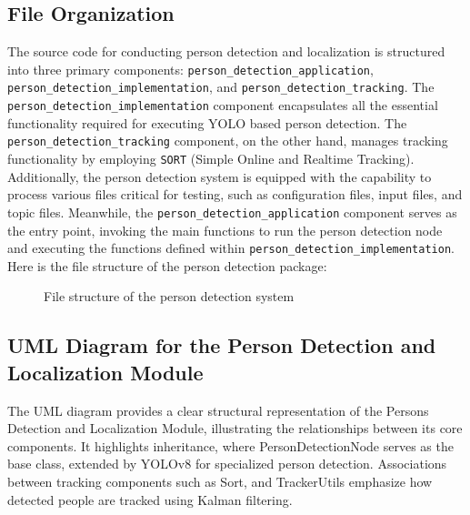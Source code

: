 \documentclass{CSSRforAfrica}
\begin{document}
\subsection*{File Organization}
The source code for conducting person detection and localization is structured into three primary components: \texttt{person\_detection\_application}, \texttt{person\_detection\_implementation}, and \texttt{person\_detection\_tracking}. The \texttt{person\_detection\_implementation} component encapsulates all the essential functionality required for executing YOLO based person detection. The \texttt{person\_detection\_tracking} component, on the other hand, manages tracking functionality by employing \texttt{SORT} (Simple Online and Realtime Tracking). Additionally, the person detection system is equipped with the capability to process various files critical for testing, such as configuration files, input files, and topic files. Meanwhile, the \texttt{person\_detection\_application} component serves as the entry point, invoking the main functions to run the person detection node and executing the functions defined within \texttt{person\_detection\_implementation}.\\

Here is the file structure of the person detection package:

\begin{figure}[h]	
	\renewcommand*\DTstyle{\ttfamily}
	\caption{File structure of the person detection system}
	\label{fig:person_detection_directory}
\end{figure}

\subsection*{UML Diagram for the Person Detection and Localization Module}
The UML diagram provides a clear structural representation of the Persons Detection and Localization Module, illustrating the relationships between its core components. It highlights inheritance, where PersonDetectionNode serves as the base class, extended by YOLOv8 for specialized person detection. Associations between tracking components such as Sort, and TrackerUtils emphasize how detected people are tracked using Kalman filtering. 
\end{document}
